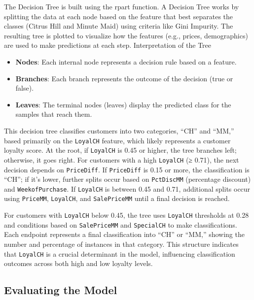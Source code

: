 \documentclass[
]{article}
\providecommand{\tightlist}{%
  \setlength{\itemsep}{0pt}\setlength{\parskip}{0pt}}
\begin{document}
The Decision Tree is built using the rpart function. A Decision Tree
works by splitting the data at each node based on the feature that best
separates the classes (Citrus Hill and Minute Maid) using criteria like
Gini Impurity. The resulting tree is plotted to visualize how the
features (e.g., prices, demographics) are used to make predictions at
each step. Interpretation of the Tree

\begin{itemize}
\tightlist
\item
  \textbf{Nodes}: Each internal node represents a decision rule based on
  a feature.
\item
  \textbf{Branches}: Each branch represents the outcome of the decision
  (true or false).
\item
  \textbf{Leaves}: The terminal nodes (leaves) display the predicted
  class for the samples that reach them.
\end{itemize}

This decision tree classifies customers into two categories, ``CH'' and
``MM,'' based primarily on the \texttt{LoyalCH} feature, which likely
represents a customer loyalty score. At the root, if \texttt{LoyalCH} is
0.45 or higher, the tree branches left; otherwise, it goes right. For
customers with a high \texttt{LoyalCH} (≥ 0.71), the next decision
depends on \texttt{PriceDiff}. If \texttt{PriceDiff} is 0.15 or more,
the classification is ``CH''; if it's lower, further splits occur based
on \texttt{PctDiscMM} (percentage discount) and \texttt{WeekofPurchase}.
If \texttt{LoyalCH} is between 0.45 and 0.71, additional splits occur
using \texttt{PriceMM}, \texttt{LoyalCH}, and \texttt{SalePriceMM} until
a final decision is reached.

For customers with \texttt{LoyalCH} below 0.45, the tree uses
\texttt{LoyalCH} thresholds at 0.28 and conditions based on
\texttt{SalePriceMM} and \texttt{SpecialCH} to make classifications.
Each endpoint represents a final classification into ``CH'' or ``MM,''
showing the number and percentage of instances in that category. This
structure indicates that \texttt{LoyalCH} is a crucial determinant in
the model, influencing classification outcomes across both high and low
loyalty levels.

\hypertarget{evaluating-the-model}{%
\subsection{Evaluating the Model}\label{evaluating-the-model}}
\end{document}
